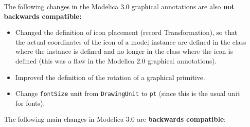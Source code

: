 The following changes in the Modelica 3.0 graphical annotations are also
\textbf{not backwards compatible:}

\begin{itemize}
\item
  Changed the definition of icon placement (record Transformation), so
  that the actual coordinates of the icon of a model instance are
  defined in the class where the instance is defined and no longer in
  the class where the icon is defined (this was a flaw in the Modelica
  2.0 graphical annotations).
\item
  Improved the definition of the rotation of a graphical primitive.
\item
  Change \lstinline!fontSize! unit from \lstinline!DrawingUnit! to \lstinline!pt! (since this is the usual
  unit for fonts).
\end{itemize}

The following main changes in Modelica 3.0 are \textbf{backwards
compatible}:

